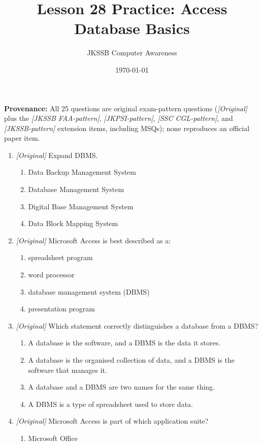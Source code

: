 \documentclass[11pt]{article}
\title{Lesson 28 Practice: Access Database Basics}
\author{JKSSB Computer Awareness}
\date{\today}
\begin{document}
\maketitle
\noindent\textbf{Provenance:} All 25 questions are original exam-pattern questions (\textit{[Original]} plus the \textit{[JKSSB FAA-pattern]}, \textit{[JKPSI-pattern]}, \textit{[SSC CGL-pattern]}, and \textit{[JKSSB-pattern]} extension items, including MSQs); none reproduces an official paper item.

\begin{enumerate}[label=\textbf{Q\arabic*.}, leftmargin=*]
\item \textit{[Original]} Expand DBMS.
  \begin{enumerate}[label=\Alph*.]
    \item Data Backup Management System
    \item Database Management System
    \item Digital Base Management System
    \item Data Block Mapping System
  \end{enumerate}
\item \textit{[Original]} Microsoft Access is best described as a:
  \begin{enumerate}[label=\Alph*.]
    \item spreadsheet program
    \item word processor
    \item database management system (DBMS)
    \item presentation program
  \end{enumerate}
\item \textit{[Original]} Which statement correctly distinguishes a database
  from a DBMS?
  \begin{enumerate}[label=\Alph*.]
    \item A database is the software, and a DBMS is the data it stores.
    \item A database is the organised collection of data, and a DBMS is the
      software that manages it.
    \item A database and a DBMS are two names for the same thing.
    \item A DBMS is a type of spreadsheet used to store data.
  \end{enumerate}
\item \textit{[Original]} Microsoft Access is part of which application suite?
  \begin{enumerate}[label=\Alph*.]
    \item Microsoft Office

\end{enumerate}
\end{enumerate}
\end{document}
